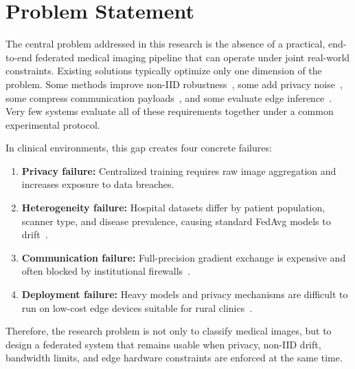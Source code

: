 \section{Problem Statement}
The central problem addressed in this research is the absence of a practical,
end-to-end federated medical imaging pipeline that can operate under joint
real-world constraints. Existing solutions typically optimize only one
dimension of the problem. Some methods improve non-IID
robustness~\cite{li2020fedprox,alekseenko2024distance,maleki2025handling},
some add privacy noise~\cite{abadi2016deep,ziller2021differentially}, some
compress communication payloads~\cite{habib2025cflsparsemed,asad2024fesec},
and some evaluate edge inference~\cite{vincent2026federated,
song2025edgecloud}. Very few systems evaluate all of these requirements
together under a common experimental protocol.

In clinical environments, this gap creates four concrete failures:
\begin{enumerate}[leftmargin=*]
  \item \textbf{Privacy failure:} Centralized training requires raw image
        aggregation and increases exposure to data breaches.
  \item \textbf{Heterogeneity failure:} Hospital datasets differ by patient
        population, scanner type, and disease prevalence, causing standard
        FedAvg models to drift~\cite{riyadi2026comparative}.
  \item \textbf{Communication failure:} Full-precision gradient exchange is
        expensive and often blocked by institutional
        firewalls~\cite{schoenpflug2025navigating}.
  \item \textbf{Deployment failure:} Heavy models and privacy mechanisms are
        difficult to run on low-cost edge devices suitable for rural
        clinics~\cite{shabarinath2025efficacy,memon2024edge}.
\end{enumerate}

Therefore, the research problem is not only to classify medical images, but to
design a federated system that remains usable when privacy, non-IID drift,
bandwidth limits, and edge hardware constraints are enforced at the same
time.

